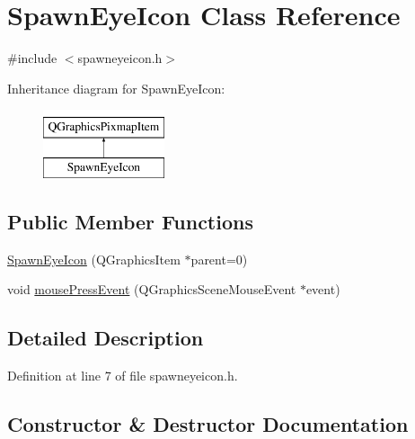 \hypertarget{class_spawn_eye_icon}{}\section{Spawn\+Eye\+Icon Class Reference}
\label{class_spawn_eye_icon}


{\ttfamily \#include $<$spawneyeicon.\+h$>$}

Inheritance diagram for Spawn\+Eye\+Icon\+:\begin{figure}[H]
\begin{center}
\leavevmode
\includegraphics[height=2.000000cm]{class_spawn_eye_icon}
\end{center}
\end{figure}
\subsection*{Public Member Functions}
\begin{DoxyCompactItemize}
\item 
\hyperlink{class_spawn_eye_icon_a89e2b8ca9ce46748cbc2e3d4ad2eddeb}{Spawn\+Eye\+Icon} (Q\+Graphics\+Item $\ast$parent=0)
\item 
void \hyperlink{class_spawn_eye_icon_a7fce32d9b81bdd2a5732372db0c928f0}{mouse\+Press\+Event} (Q\+Graphics\+Scene\+Mouse\+Event $\ast$event)
\end{DoxyCompactItemize}


\subsection{Detailed Description}


Definition at line 7 of file spawneyeicon.\+h.



\subsection{Constructor \& Destructor Documentation}
\mbox{\label{class_spawn_eye_icon_a89e2b8ca9ce46748cbc2e3d4ad2eddeb}} 
